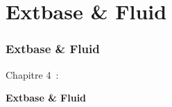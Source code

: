 %

\section{Extbase \& Fluid}
\begin{frame}[fragile]
	\frametitle{Extbase \& Fluid}

	\begin{center}\huge{Chapitre 4~:}\end{center}
	\begin{center}\huge{\color{typo3darkgrey}\textbf{Extbase \& Fluid}}\end{center}

\end{frame}

